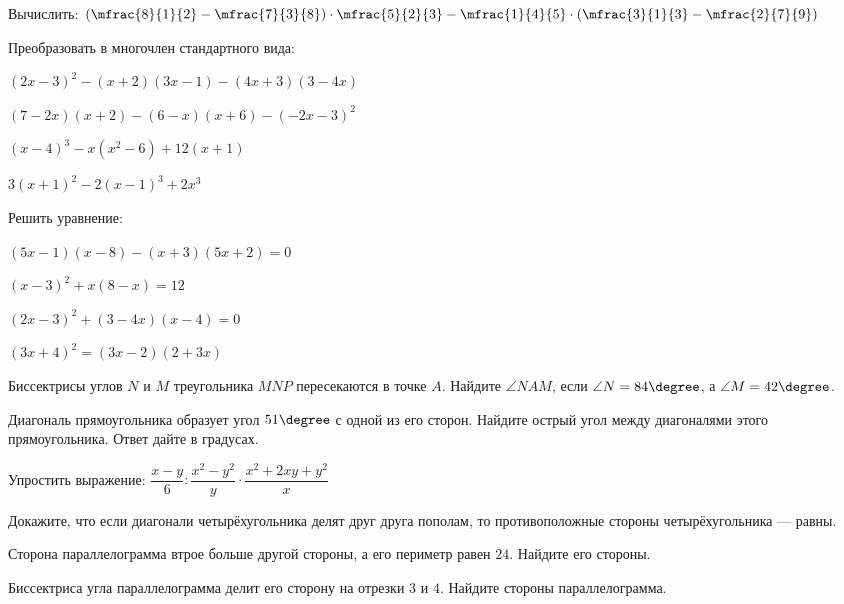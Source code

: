 %
%
%	
%
%
\begin{consultation}
	\begin{listofex}
		\item Вычислить: \( \left( \mfrac{8}{1}{2}-\mfrac{7}{3}{8} \right)\cdot\mfrac{5}{2}{3}-\mfrac{1}{4}{5}\cdot\left( \mfrac{3}{1}{3}-\mfrac{2}{7}{9} \right) \)
		\item Преобразовать в многочлен стандартного вида:
		\begin{enumcols}[itemcolumns=2]
			\item \( (2x-3)^2-(x+2)(3x-1)-(4x+3)(3-4x) \)
			\item \( (7-2x)(x+2)-(6-x)(x+6)-(-2x-3)^2 \)
			\item \( (x-4)^3-x(x^2-6)+12(x+1) \)
			\item \( 3(x+1)^2-2(x-1)^3+2x^3 \)
		\end{enumcols}
		\item Решить уравнение:
		\begin{enumcols}[itemcolumns=2]
			\item \( (5x-1)(x-8)-(x+3)(5x+2)=0 \)
			\item \( (x-3)^2+x(8-x)=12 \)
			\item \( (2x-3)^2+(3-4x)(x-4)=0 \)
			\item \( (3x+4)^2=(3x-2)(2+3x) \)
		\end{enumcols}
		\item Биссектрисы углов \( N \) и \( M \) треугольника \( MNP \) пересекаются в точке \( A \). Найдите \( \angle NAM \), если \( \angle N = 84\degree \), а \( \angle M = 42\degree \).
		\item Диагональ прямоугольника образует угол \( 51\degree \) с одной из его сторон. Найдите острый угол между диагоналями этого прямоугольника. Ответ дайте в градусах.
	\end{listofex}
\end{consultation}
\newpage
\begin{consultation}
	\begin{listofex}
		\item Упростить выражение: \( \dfrac{x-y}{6}:\dfrac{x^2-y^2}{y}\cdot\dfrac{x^2+2xy+y^2}{x} \)
		\item Докажите, что если диагонали четырёхугольника делят друг друга пополам, то противоположные стороны четырёхугольника --- равны.
		\item Сторона параллелограмма втрое больше другой стороны, а его периметр равен \( 24 \). Найдите его стороны.
		\item Биссектриса угла параллелограмма делит его сторону на отрезки \( 3 \) и \( 4 \). Найдите стороны параллелограмма.
		
	\end{listofex}
\end{consultation}